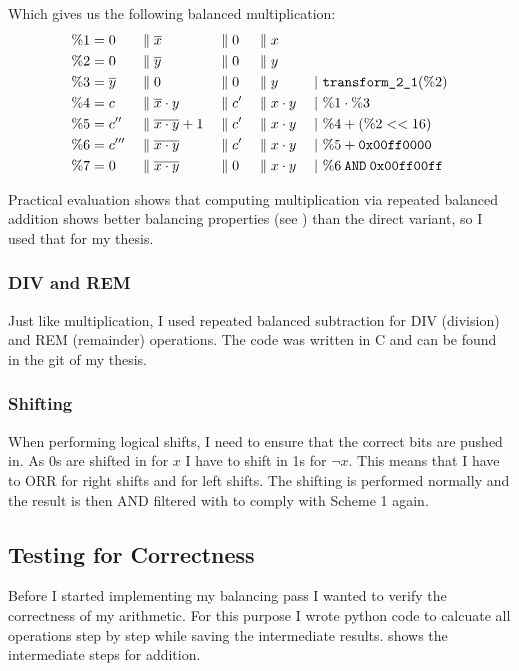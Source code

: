 Which gives us the following balanced multiplication:
\begin{align*}
  \%1 &= 0 &&\; \| \; \overline{x} &&\; \| \; 0 &&\; \| \; x &&\\
  \%2 &= 0 &&\; \| \; \overline{y} &&\; \| \; 0 &&\; \| \; y &&\\
  \%3 &= \overline{y} &&\; \| \; 0 &&\; \| \; 0 &&\; \| \; y && \;|\ \texttt{transform\_2\_1}(\%2)\\
  \%4 &= c &&\; \| \; \overline{x}\cdot y &&\; \| \; c' &&\; \| \; x \cdot y && \;|\ \%1 \cdot \%3\\
  \%5 &= c'' &&\; \| \; \overline{x \cdot y} +1 &&\; \| \; c' &&\; \| \; x \cdot y && \;|\ \%4 + (\%2 << 16)\\
  \%6 &= c''' &&\; \| \; \overline{x \cdot y} &&\; \| \; c' &&\; \| \; x \cdot y && \;|\ \%5 + \texttt{0x00ff0000}\\
  \%7 &= 0 &&\; \| \; \overline{x \cdot y} &&\; \| \; 0 &&\; \| \; x \cdot y && \;|\ \%6 \mathbin{\texttt{AND}} \texttt{0x00ff00ff}
\end{align*}

Practical evaluation shows that computing multiplication via repeated balanced addition shows better balancing properties (see ) than the direct variant, so I used that for my thesis.

\subsubsection{DIV and REM}
Just like multiplication, I used repeated balanced subtraction for DIV (division) and REM (remainder) operations.
The code was written in C and can be found in the git of my thesis\cite{git}.

\subsubsection{Shifting}
When performing logical shifts, I need to ensure that the correct bits are pushed in.
As 0s are shifted in for $x$ I have to shift in 1s for $\neg{x}$.
This means that I have to ORR  for right shifts and  for left shifts.
The shifting is performed normally and the result is then AND filtered with  to comply with Scheme 1 again.

\subsection{Testing for Correctness}
Before I started implementing my balancing pass I wanted to verify the correctness of my arithmetic.
For this purpose I wrote python code to calcuate all operations step by step while saving the intermediate results.
 shows the intermediate steps for addition.

